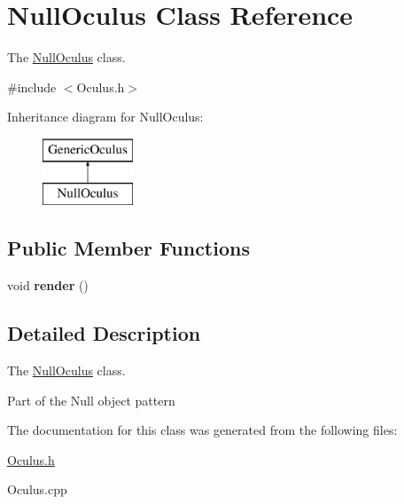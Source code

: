 \hypertarget{classNullOculus}{}\section{Null\+Oculus Class Reference}
\label{classNullOculus}


The \hyperlink{classNullOculus}{Null\+Oculus} class.  




{\ttfamily \#include $<$Oculus.\+h$>$}

Inheritance diagram for Null\+Oculus\+:\begin{figure}[H]
\begin{center}
\leavevmode
\includegraphics[height=2.000000cm]{classNullOculus}
\end{center}
\end{figure}
\subsection*{Public Member Functions}
\begin{DoxyCompactItemize}
\item 
\hypertarget{classNullOculus_af98f657d9d119a7ed26a43da5ffd0096}{}void {\bfseries render} ()\label{classNullOculus_af98f657d9d119a7ed26a43da5ffd0096}

\end{DoxyCompactItemize}


\subsection{Detailed Description}
The \hyperlink{classNullOculus}{Null\+Oculus} class. 

Part of the Null object pattern 

The documentation for this class was generated from the following files\+:\begin{DoxyCompactItemize}
\item 
\hyperlink{Oculus_8h}{Oculus.\+h}\item 
Oculus.\+cpp\end{DoxyCompactItemize}
